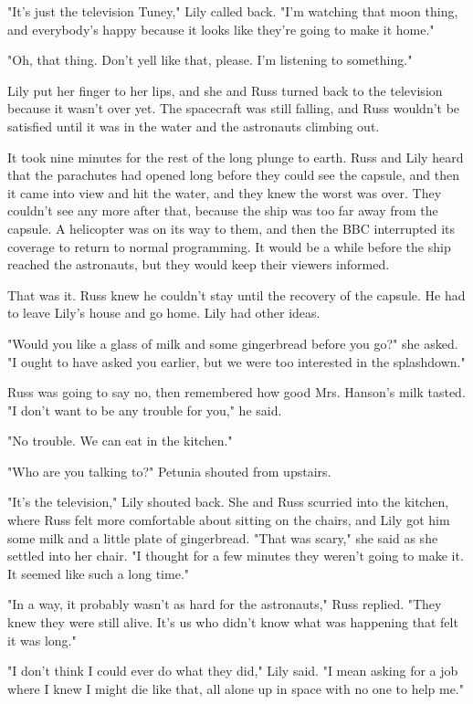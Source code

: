 \documentclass[a4paper,11pt]{article}
\begin{document}
"It's just the television Tuney," Lily called back. "I'm watching that moon thing, and everybody's happy because it looks like they're going to make it home."

"Oh, that thing. Don't yell like that, please. I'm listening to something."

Lily put her finger to her lips, and she and Russ turned back to the television because it wasn't over yet. The spacecraft was still falling, and Russ wouldn't be satisfied until it was in the water and the astronauts climbing out.

It took nine minutes for the rest of the long plunge to earth. Russ and Lily heard that the parachutes had opened long before they could see the capsule, and then it came into view and hit the water, and they knew the worst was over. They couldn't see any more after that, because the ship was too far away from the capsule. A helicopter was on its way to them, and then the BBC interrupted its coverage to return to normal programming. It would be a while before the ship reached the astronauts, but they would keep their viewers informed.

That was it. Russ knew he couldn't stay until the recovery of the capsule. He had to leave Lily's house and go home. Lily had other ideas.

"Would you like a glass of milk and some gingerbread before you go?" she asked. "I ought to have asked you earlier, but we were too interested in the splashdown."

Russ was going to say no, then remembered how good Mrs. Hanson's milk tasted. "I don't want to be any trouble for you," he said.

"No trouble. We can eat in the kitchen."

"Who are you talking to?" Petunia shouted from upstairs.

"It's the television," Lily shouted back. She and Russ scurried into the kitchen, where Russ felt more comfortable about sitting on the chairs, and Lily got him some milk and a little plate of gingerbread. "That was scary," she said as she settled into her chair. "I thought for a few minutes they weren't going to make it. It seemed like such a long time."

"In a way, it probably wasn't as hard for the astronauts," Russ replied. "They knew they were still alive. It's us who didn't know what was happening that felt it was long."

"I don't think I could ever do what they did," Lily said. "I mean asking for a job where I knew I might die like that, all alone up in space with no one to help me."
\end{document}
